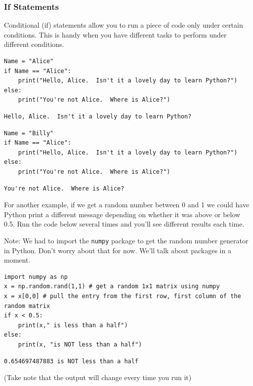 \subsubsection{If Statements}
Conditional (if) statements allow you to run a piece of code only under certain
conditions.  This is handy when you have different tasks to perform under different
conditions.  

\begin{example}
    
    \bcode
\begin{lstlisting}
Name = "Alice"
if Name == "Alice":
    print("Hello, Alice.  Isn't it a lovely day to learn Python?")
else:
    print("You're not Alice.  Where is Alice?")
\end{lstlisting}
\boutput
\begin{lstlisting}
Hello, Alice.  Isn't it a lovely day to learn Python?
\end{lstlisting}
\bcode
\begin{lstlisting}
Name = "Billy"
if Name == "Alice":
    print("Hello, Alice.  Isn't it a lovely day to learn Python?")
else:
    print("You're not Alice.  Where is Alice?")
\end{lstlisting}
\boutput
\begin{lstlisting}
You're not Alice.  Where is Alice?
\end{lstlisting}
\end{example}

\begin{example}
    For another example, if we get a random number between 0 and 1 we could have Python
    print a different message depending on whether it was above or below 0.5. Run the code
    below several times and you'll see different results each time.

    Note: We had to import the \texttt{numpy} package to get the random number generator
    in Python.  Don't worry about that for now.  We'll talk about packages in a moment.

    
    \bcode
\begin{lstlisting}
import numpy as np
x = np.random.rand(1,1) # get a random 1x1 matrix using numpy
x = x[0,0] # pull the entry from the first row, first column of the random matrix
if x < 0.5:
    print(x," is less than a half")
else:
    print(x, "is NOT less than a half")
\end{lstlisting}
\boutput
\begin{lstlisting}
0.654697487883 is NOT less than a half
\end{lstlisting}
(Take note that the output will change every time you run it)
\end{example}

